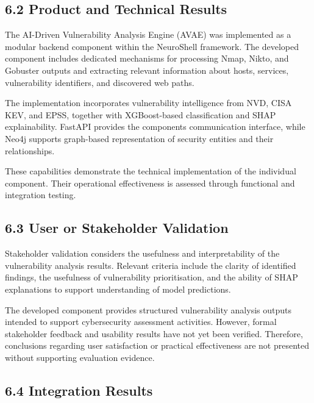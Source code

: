 \documentclass[
]{article}
\begin{document}
\hypertarget{product-and-technical-results}{%
\subsection{6.2 Product and Technical
Results}\label{product-and-technical-results}}

The AI-Driven Vulnerability Analysis Engine (AVAE) was implemented as a
modular backend component within the NeuroShell framework. The developed
component includes dedicated mechanisms for processing Nmap, Nikto, and
Gobuster outputs and extracting relevant information about hosts,
services, vulnerability identifiers, and discovered web paths.

The implementation incorporates vulnerability intelligence from NVD,
CISA KEV, and EPSS, together with XGBoost-based classification and SHAP
explainability. FastAPI provides the component\textquotesingle s
communication interface, while Neo4j supports graph-based representation
of security entities and their relationships.

These capabilities demonstrate the technical implementation of the
individual component. Their operational effectiveness is assessed
through functional and integration testing.

\hypertarget{user-or-stakeholder-validation}{%
\subsection{6.3 User or Stakeholder
Validation}\label{user-or-stakeholder-validation}}

Stakeholder validation considers the usefulness and interpretability of
the vulnerability analysis results. Relevant criteria include the
clarity of identified findings, the usefulness of vulnerability
prioritisation, and the ability of SHAP explanations to support
understanding of model predictions.

The developed component provides structured vulnerability analysis
outputs intended to support cybersecurity assessment activities.
However, formal stakeholder feedback and usability results have not yet
been verified. Therefore, conclusions regarding user satisfaction or
practical effectiveness are not presented without supporting evaluation
evidence.

\hypertarget{integration-results}{%
\subsection{6.4 Integration Results}\label{integration-results}}
\end{document}
